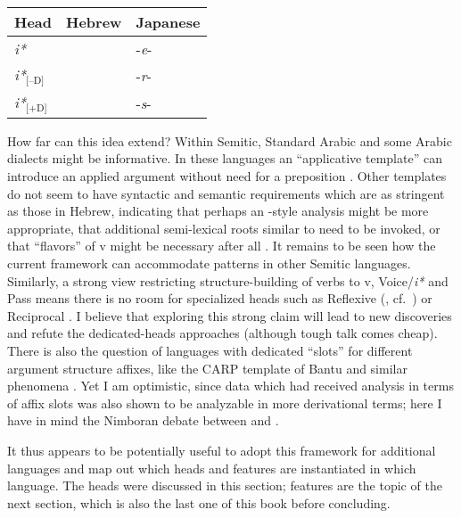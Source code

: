 \ex\label{ex:heads-langs2}
	\begin{tabular}{l|ll}
	Head 		& Hebrew 	  		& Japanese\\\hline
	\emph{i*}   	& \tkal          & -\emph{e}-\\
	\emph{i*}$_{\text{[--D]}}$ 	& \tnif 		& -\emph{r}-\\
	\emph{i*}$_{\text{[+D]}}$	& \thif		& -\emph{s}-\\
	\end{tabular}
\xe

How far can this idea extend? Within Semitic, Standard Arabic and some Arabic dialects might be informative. In these languages an ``applicative template'' can introduce an applied argument without need for a preposition \citep{alkaabi15phd}. Other templates do not seem to have syntactic and semantic requirements which are as stringent as those in Hebrew, indicating that perhaps an \citeauthor{arad05}-style analysis might be more appropriate, that additional semi-lexical roots similar to {\va} need to be invoked, or that ``flavors'' of v might be necessary after all \citep{katie13}. It remains to be seen how the current framework can accommodate patterns in other Semitic languages. Similarly, a strong view restricting structure-building of verbs to v, Voice/\textit{i*} and Pass means there is no room for specialized heads such as Reflexive (\citealt{ahn15phd}, cf.~\citealt{spathas17camvoice,spathas17debrecen}) or Reciprocal \citep{bruening04}. I believe that exploring this strong claim will lead to new discoveries and refute the dedicated-heads approaches (although tough talk comes cheap). There is also the question of languages with dedicated ``slots'' for different argument structure affixes, like the CARP template of Bantu and similar phenomena \citep{hyman03,paster05}. Yet I am optimistic, since data which had received analysis in terms of affix slots was also shown to be analyzable in more derivational terms; here I have in mind the Nimboran debate between \cite{inkelas93} and \cite{noyer98}.

It thus appears to be potentially useful to adopt this framework for additional languages and map out which heads and features are instantiated in which language. The heads were discussed in this section; features are the topic of the next section, which is also the last one of this book before concluding.


